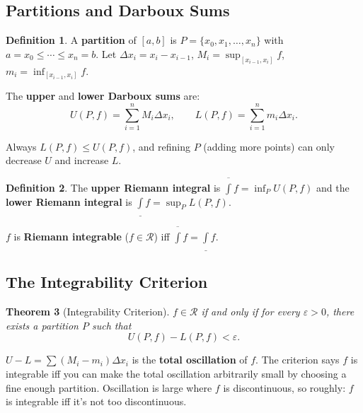 \documentclass[11pt]{article}
\newcommand{\eps}{\varepsilon}
\theoremstyle{myplain}
\newtheorem{theorem}{Theorem}[section]
\theoremstyle{definition}
\newtheorem{definition}[theorem]{Definition}
\theoremstyle{remark}
\begin{document}
\subsection{Partitions and Darboux Sums}

\begin{definition}
A \textbf{partition} of $[a,b]$ is $P = \{x_0, x_1, \ldots, x_n\}$ with $a = x_0 \leq \cdots \leq x_n = b$. Let $\Delta x_i = x_i - x_{i-1}$, $M_i = \sup_{[x_{i-1},x_i]} f$, $m_i = \inf_{[x_{i-1},x_i]} f$.

The \textbf{upper} and \textbf{lower Darboux sums} are:
$$U(P,f) = \sum_{i=1}^n M_i \Delta x_i, \qquad L(P,f) = \sum_{i=1}^n m_i \Delta x_i.$$
\end{definition}

Always $L(P,f) \leq U(P,f)$, and refining $P$ (adding more points) can only decrease $U$ and increase $L$.

\begin{definition}
The \textbf{upper Riemann integral} is $\overline{\int} f = \inf_P U(P,f)$ and the \textbf{lower Riemann integral} is $\underline{\int} f = \sup_P L(P,f)$.

$f$ is \textbf{Riemann integrable} ($f \in \mathscr{R}$) iff $\overline{\int} f = \underline{\int} f$.
\end{definition}

\subsection{The Integrability Criterion}

\begin{theorem}[Integrability Criterion]
$f \in \mathscr{R}$ if and only if for every $\eps > 0$, there exists a partition $P$ such that
$$U(P,f) - L(P,f) < \eps.$$
\end{theorem}

\begin{insight}
$U - L = \sum (M_i - m_i)\Delta x_i$ is the \textbf{total oscillation} of $f$. The criterion says $f$ is integrable iff you can make the total oscillation arbitrarily small by choosing a fine enough partition. Oscillation is large where $f$ is discontinuous, so roughly: $f$ is integrable iff it's not too discontinuous.
\end{insight}
\end{document}
